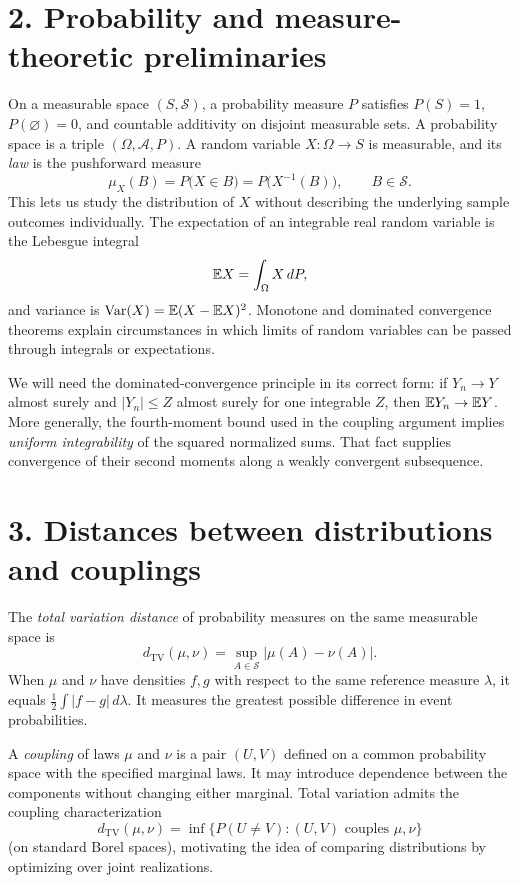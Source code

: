 \documentclass[10pt,a4paper]{article}
\begin{document}
\section*{2. Probability and measure-theoretic preliminaries}
On a measurable space $(S,\mathcal S)$, a probability measure $P$ satisfies $P(S)=1$, $P(\varnothing)=0$, and countable additivity on disjoint measurable sets. A probability space is a triple $(\Omega,\mathcal A,P)$. A random variable $X:\Omega\to S$ is measurable, and its \emph{law} is the pushforward measure
\[
\mu_X(B)=P\bigl(X\in B\bigr)=P\bigl(X^{-1}(B)\bigr),\qquad B\in\mathcal S.
\]
This lets us study the distribution of $X$ without describing the underlying sample outcomes individually. The expectation of an integrable real random variable is the Lebesgue integral
\[
\mathbb E X=\int_\Omega X\,dP,
\]
and variance is $\operatorname{Var}(X)=\mathbb E(X-\mathbb E X)^2$. Monotone and dominated convergence theorems explain circumstances in which limits of random variables can be passed through integrals or expectations.

We will need the dominated-convergence principle in its correct form: if $Y_n\to Y$ almost surely and $|Y_n|\le Z$ almost surely for one integrable $Z$, then $\mathbb E Y_n\to\mathbb E Y$. More generally, the fourth-moment bound used in the coupling argument implies \emph{uniform integrability} of the squared normalized sums. That fact supplies convergence of their second moments along a weakly convergent subsequence.

\section*{3. Distances between distributions and couplings}
The \emph{total variation distance} of probability measures on the same measurable space is
\[
d_{\mathrm{TV}}(\mu,\nu)=\sup_{A\in\mathcal S}|\mu(A)-\nu(A)|.
\]
When $\mu$ and $\nu$ have densities $f,g$ with respect to the same reference measure $\lambda$, it equals $\frac12\int|f-g|\,d\lambda$. It measures the greatest possible difference in event probabilities.

A \emph{coupling} of laws $\mu$ and $\nu$ is a pair $(U,V)$ defined on a common probability space with the specified marginal laws. It may introduce dependence between the components without changing either marginal. Total variation admits the coupling characterization
\[
d_{\mathrm{TV}}(\mu,\nu)=\inf\bigl\{P(U\ne V):(U,V)\text{ couples }\mu,\nu\bigr\}
\]
(on standard Borel spaces), motivating the idea of comparing distributions by optimizing over joint realizations.
\end{document}
